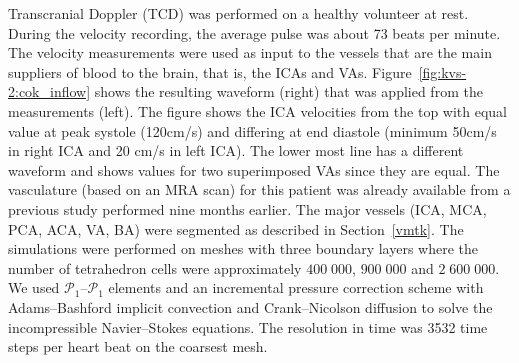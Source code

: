 Transcranial Doppler (TCD) was performed on a healthy volunteer at
rest. During the velocity recording, the average pulse was about 73
beats per minute. The velocity measurements
were used as input to the vessels that are the main suppliers
of blood to the brain, that is, the ICAs and
VAs. Figure~\ref{fig:kvs-2:cok_inflow} shows the resulting waveform
(right) that was applied from the measurements (left). The figure
shows the ICA velocities from the top with equal value at peak systole
(120cm/s) and differing at end diastole (minimum 50cm/s in right ICA
and 20 cm/s in left ICA). The lower most line has a different waveform
and shows values for two superimposed VAs since they are equal. The
vasculature (based on an MRA scan) for this patient was already available from a
previous study performed nine months earlier. The major vessels (ICA,
MCA, PCA, ACA, VA, BA) were segmented as described in
Section~\ref{vmtk}. The simulations were performed on meshes with
three boundary layers where the number of tetrahedron cells were approximately
$400\;000$, $900\;000$ and $2\;600\;000$. We used
$\mathcal{P}_1$--$\mathcal{P}_1$ elements and an incremental pressure
correction scheme with Adams--Bashford implicit convection and
Crank--Nicolson diffusion to solve the incompressible Navier--Stokes
equations. The resolution in time was 3532 time steps per heart beat
on the coarsest mesh.



